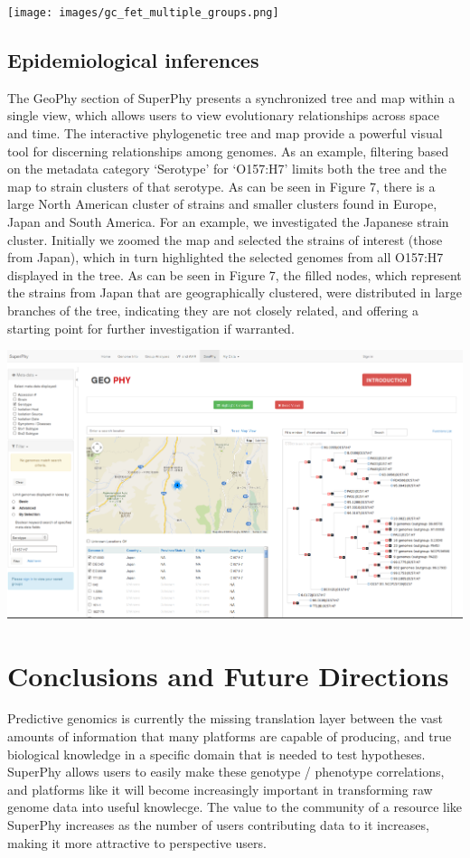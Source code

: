 \documentclass[doublespacing, linenumbers]{bmcart}
\begin{document}
\texttt{[image: images/gc\_fet\_multiple\_groups.png]}

\subsection{Epidemiological inferences}
The GeoPhy section of SuperPhy presents a synchronized tree and map within a single view, which allows users to view evolutionary relationships across space and time. The interactive phylogenetic tree and map provide a powerful visual tool for discerning relationships among genomes. As an example, filtering based on the metadata category `Serotype' for `O157:H7' limits both the tree and the map to strain clusters of that serotype. As can be seen in Figure 7, there is a large North American cluster of strains and smaller clusters found in Europe, Japan and South America. For an example, we investigated the Japanese strain cluster. Initially we zoomed the map and selected the strains of interest (those from Japan), which in turn highlighted the selected genomes from all O157:H7 displayed in the tree. As can be seen in Figure 7, the filled nodes, which represent the strains from Japan that are geographically clustered, were distributed in large branches of the tree, indicating they are not closely related, and offering a starting point for further investigation if warranted.

\includegraphics[width=\textwidth]{images/geophy_o157.png}

\section{Conclusions and Future Directions}
Predictive genomics is currently the missing translation layer between the vast amounts of information that many platforms are capable of producing, and true biological knowledge in a specific domain that is needed to test hypotheses. SuperPhy allows users to easily make these genotype / phenotype correlations, and platforms like it will become increasingly important in transforming raw genome data into useful knowlecge. The value to the community of a resource like SuperPhy increases as the number of users contributing data to it increases, making it more attractive to perspective users. 
\end{document}
